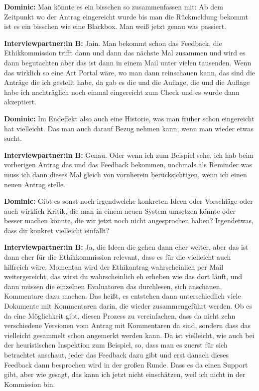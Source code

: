 \documentclass[a4paper,12pt,twoside,numbers=noendperiod]{scrreprt}
\begin{document}
\textbf{Dominic:} Man könnte es ein bisschen so zusammenfassen mit: Ab dem Zeitpunkt wo der Antrag eingereicht wurde bis man die Rückmeldung bekommt ist es ein bisschen wie eine Blackbox. Man weiß jetzt genau was passiert.

\textbf{Interviewpartner:in B:} Jain. Man bekommt schon das Feedback, die Ethikkommission trifft dann und dann das nächste Mal zusammen und wird es dann begutachten aber das ist dann in einem Mail unter vielen tausenden. Wenn das wirklich so eine Art Portal wäre, wo man dann reinschauen kann, das sind die Anträge die ich gestellt habe, da gab es die und die Auflage, die und die Auflage habe ich nachträglich noch einmal eingereicht zum Check und es wurde dann akzeptiert.

\textbf{Dominic:} Im Endeffekt also auch eine Historie, was man früher schon eingereicht hat vielleicht. Das man auch darauf Bezug nehmen kann, wenn man wieder etwas sucht.

\textbf{Interviewpartner:in B:} Genau. Oder wenn ich zum Beispiel sehe, ich hab beim vorherigen Antrag das und das Feedback bekommen, nochmals als Reminder was muss ich dann dieses Mal gleich von vornherein berücksichtigen, wenn ich einen neuen Antrag stelle.

\textbf{Dominic:} Gibt es sonst noch irgendwelche konkreten Ideen oder Vorschläge oder auch wirklich Kritik, die man in einem neuen System umsetzen könnte oder besser machen könnte, die wir jetzt noch nicht angesprochen haben? Irgendetwas, dass dir konkret vielleicht einfällt?

\textbf{Interviewpartner:in B:} Ja, die Ideen die gehen dann eher weiter, aber das ist dann eher für die Ethikkommission relevant, dass es für die vielleicht auch hilfreich wäre. Momentan wird der Ethikantrag wahrscheinlich per Mail weitergereicht, das wirst du wahrscheinlich eh erheben wie das dort läuft, und dann müssen die einzelnen Evaluatoren das durchlesen, sich anschauen, Kommentare dazu machen. Das heißt, es entstehen dann unterschiedlich viele Dokumente mit Kommentaren darin, die wieder zusammengeführt werden. Ob es da eine Möglichkeit gibt, diesen Prozess zu vereinfachen, dass da nicht zehn verschiedene Versionen vom Antrag mit Kommentaren da sind, sondern dass das vielleicht gesammelt schon angemerkt werden kann. Da ist vielleicht, wie auch bei der heuristischen Inspektion zum Beispiel, so, dass man es zuerst für sich betrachtet anschaut, jeder das Feedback dazu gibt und erst danach dieses Feedback dann besprochen wird in der großen Runde. Dass es da einen Support gibt, aber wie gesagt, das kann ich jetzt nicht einschätzen, weil ich nicht in der Kommission bin.
\end{document}
